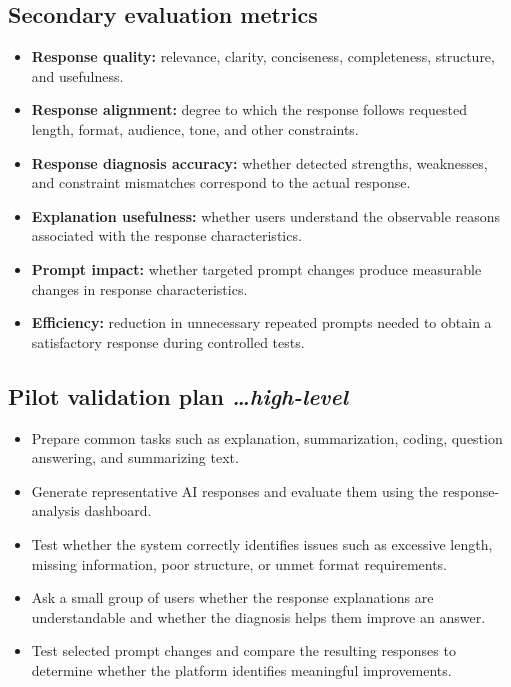 \documentclass[11pt,a4paper]{article}
\newcommand{\BvrHint}[1]{%
  {\normalfont\normalsize\itshape\hfill #1}}
\begin{document}
\subsection{Secondary evaluation metrics}

\begin{itemize}[leftmargin=0.7cm]
    \item \textbf{Response quality:} relevance, clarity, conciseness,
    completeness, structure, and usefulness.
    \item \textbf{Response alignment:} degree to which the response follows
    requested length, format, audience, tone, and other constraints.
    \item \textbf{Response diagnosis accuracy:} whether detected strengths,
    weaknesses, and constraint mismatches correspond to the actual response.
    \item \textbf{Explanation usefulness:} whether users understand the
    observable reasons associated with the response characteristics.
    \item \textbf{Prompt impact:} whether targeted prompt changes produce
    measurable changes in response characteristics.
    \item \textbf{Efficiency:} reduction in unnecessary repeated prompts
    needed to obtain a satisfactory response during controlled tests.
\end{itemize}

\subsection{Pilot validation plan%
  \BvrHint{\ldots high-level}}

\begin{itemize}[leftmargin=0.7cm]
    \item Prepare common tasks such as explanation, summarization, coding,
    question answering, and summarizing text.
    \item Generate representative AI responses and evaluate them using the
    response-analysis dashboard.
    \item Test whether the system correctly identifies issues such as
    excessive length, missing information, poor structure, or unmet format
    requirements.
    \item Ask a small group of users whether the response explanations are
    understandable and whether the diagnosis helps them improve an answer.
    \item Test selected prompt changes and compare the resulting responses
    to determine whether the platform identifies meaningful improvements.
\end{itemize}
\end{document}
